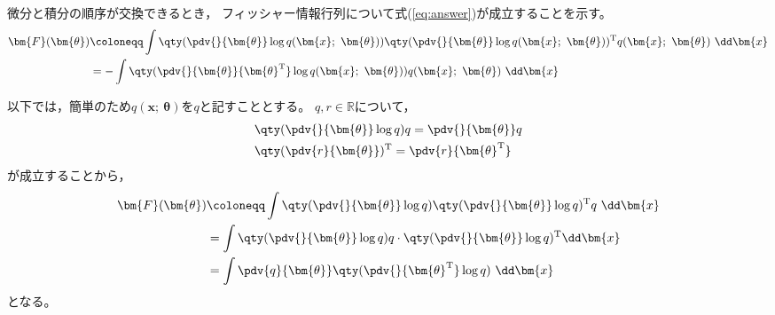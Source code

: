 \documentclass[class=jsarticle, crop=false, dvipdfmx, fleqn]{standalone}
\begin{document}
\section{}



微分と積分の順序が交換できるとき，
フィッシャー情報行列について式(\ref{eq:answer})が成立することを示す。
\begin{align}
	\bm{F}(\bm{\theta})
		& \coloneqq \int \qty(\pdv{}{\bm{\theta}} \log{q(\bm{x};\ \bm{\theta})}) \qty(\pdv{}{\bm{\theta}} \log{q(\bm{x};\ \bm{\theta})})^\mathrm{T} q(\bm{x};\ \bm{\theta}) \ \dd\bm{x} \\
		& = - \int \qty(\pdv{}{\bm{\theta}}{\bm{\theta}^\mathrm{T}} \log{q(\bm{x};\ \bm{\theta})}) q(\bm{x};\ \bm{\theta}) \ \dd\bm{x} \label{eq:answer}
\end{align}

以下では，簡単のため\(q(\bm{x};\ \bm{\theta})\)を\(q\)と記すこととする。
\(q, r \in \mathbb{R}\)について，
\begin{align}
	& \qty(\pdv{}{\bm{\theta}} \log{q}) q = \pdv{}{\bm{\theta}} q \\
	& \qty(\pdv{r}{\bm{\theta}})^\mathrm{T} = \pdv{r}{\bm{\theta}^\mathrm{T}}
\end{align}
が成立することから，
\begin{align}
	\bm{F}(\bm{\theta})
		& \coloneqq \int \qty(\pdv{}{\bm{\theta}} \log{q}) \qty(\pdv{}{\bm{\theta}} \log{q})^\mathrm{T} q \ \dd\bm{x} \\
		& = \int \qty(\pdv{}{\bm{\theta}} \log{q}) q \cdot \qty(\pdv{}{\bm{\theta}} \log{q})^\mathrm{T} \dd\bm{x} \\
		& = \int \pdv{q}{\bm{\theta}} \qty(\pdv{}{\bm{\theta}^\mathrm{T}} \log{q}) \ \dd\bm{x} \label{eq:1}
\end{align}
となる。
\end{document}
